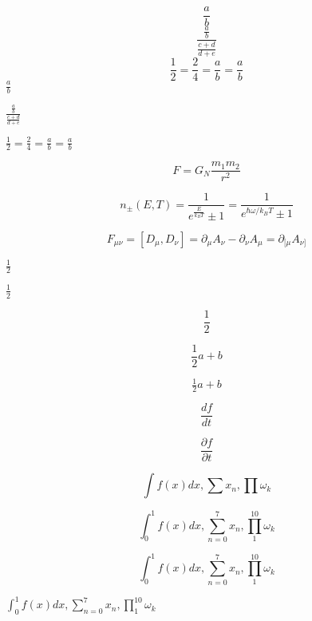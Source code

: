 \documentclass[letterpaper,notitlepage,11pt]{article}
\begin{document}
\begin{equation}
\frac{a}{b}
\end{equation}
\begin{equation}
\frac{\frac{a}{b}}{\frac{c+d}{d+e}}
\end{equation}
\begin{equation}
\frac12=\frac24=\frac{a}b=\frac{a}{b}
\end{equation}
$\frac{a}{b}$

$\frac{\frac{a}{b}}{\frac{c+d}{d+e}}$

$\frac12=\frac24=\frac{a}b=\frac{a}{b}$

\begin{equation}
F = G_N \frac{m_1 m_2}{r^2}
\end{equation}

\begin{equation}
n_{\pm}(E,T)=\frac1{e^{\frac{E}{k_BT}}\pm1} =\frac1{e^{{\hbar\omega}/{k_BT}}\pm1}
\end{equation}

\begin{equation}
F_{\mu \nu} = [D_\mu, D_\nu] = \partial_\mu A_\nu-\partial_\nu A_\mu = \partial_{[\mu} A_{\nu]}
\end{equation}

$\frac{1}{2}$

\(\tfrac12\)

\[ \frac{1}{2} \]

\[ \frac12a+b\]

\[ \tfrac12a+b\]

\newpage

\begin{equation}
\frac{df}{dt}
\end{equation}

\begin{equation}
\frac{\partial f}{\partial t}
\end{equation}

\begin{equation}
\int f(x) dx, \sum x_n, \prod \omega_k
\end{equation}

\begin{equation}
\int_0^1 f(x)dx, \sum_{n=0}^7 x_n, \prod_1^{10} \omega_k
\end{equation}

\begin{equation}
\int^1_0 f(x)dx, \sum^7_{n=0} x_n, \prod^{10}_1 \omega_k
\end{equation}

$\int_0^1 f(x)dx, \sum_{n=0}^7 x_n, \prod_1^{10} \omega_k$
\end{document}
